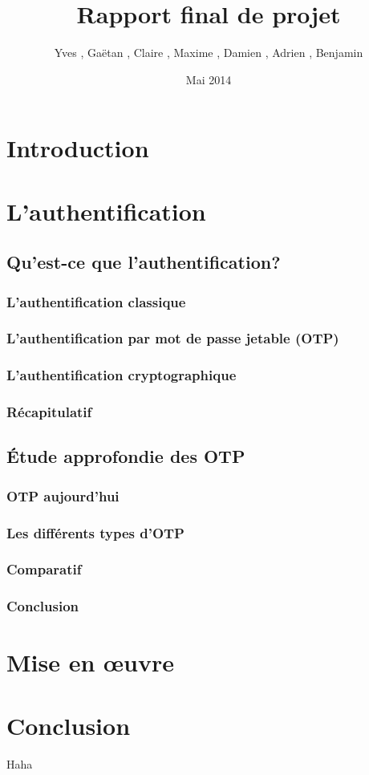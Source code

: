 \documentclass{"../../res/univ-projet-rapport"}
\title{Rapport final de projet}
\author{Yves \bsc{Adegoloye}, Gaëtan \bsc{Ferry}, Claire \bsc{Hardouin}, Maxime \bsc{Michotte}, Damien \bsc{Picard}, Adrien \bsc{Smondack}, Benjamin \bsc{Zigh}}
\date{Mai 2014}
\begin{document}
\maketitle
\tableofcontents
\newpage

\chapter{Introduction}



\chapter{L'authentification}

\section{Qu'est-ce que l'authentification?}

\subsection{L'authentification classique}

\subsection{L'authentification par mot de passe jetable (OTP)}

\subsection{L'authentification cryptographique}

\subsection{Récapitulatif}


\section{Étude approfondie des OTP}

\subsection{OTP aujourd'hui}

\subsection{Les différents types d'OTP}

\subsection{Comparatif}

\subsection{Conclusion}


\chapter{Mise en œuvre}

\chapter{Conclusion}
Haha\cite{HOTPrfc}

{}
\end{document}
